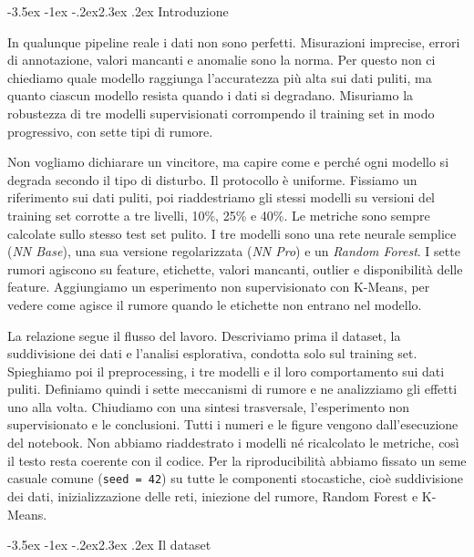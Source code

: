 \documentclass[12pt,a4paper]{article}
\makeatletter
\renewcommand\section{\@startsection{section}{1}{\z@}%
  {-3.5ex \@plus -1ex \@minus -.2ex}{2.3ex \@plus.2ex}%
  {\normalfont\Large\bfseries}}
\makeatother
\begin{document}
\section{Introduzione}\label{sec:intro}

In qualunque pipeline reale i dati non sono perfetti. Misurazioni imprecise, errori di annotazione,
valori mancanti e anomalie sono la norma. Per questo non ci chiediamo quale modello raggiunga
l'accuratezza più alta sui dati puliti, ma quanto ciascun modello resista quando i dati si degradano.
Misuriamo la robustezza di tre modelli supervisionati corrompendo il training set in modo progressivo,
con sette tipi di rumore.

Non vogliamo dichiarare un vincitore, ma capire come e perché ogni modello si degrada secondo il tipo
di disturbo. Il protocollo è uniforme. Fissiamo un riferimento sui dati puliti, poi riaddestriamo gli
stessi modelli su versioni del training set corrotte a tre livelli, 10\%, 25\% e 40\%. Le metriche
sono sempre calcolate sullo stesso test set pulito. I tre modelli sono una rete neurale semplice
(\textit{NN Base}), una sua versione regolarizzata (\textit{NN Pro}) e un \textit{Random Forest}. I sette
rumori agiscono su feature, etichette, valori mancanti, outlier e disponibilità delle feature.
Aggiungiamo un esperimento non supervisionato con K-Means, per vedere come agisce il rumore quando le
etichette non entrano nel modello.

La relazione segue il flusso del lavoro. Descriviamo prima il dataset, la suddivisione dei dati e
l'analisi esplorativa, condotta solo sul training set. Spieghiamo poi il preprocessing, i tre modelli
e il loro comportamento sui dati puliti. Definiamo quindi i sette meccanismi di rumore e ne analizziamo
gli effetti uno alla volta. Chiudiamo con una sintesi trasversale, l'esperimento non supervisionato e
le conclusioni. Tutti i numeri e le figure vengono dall'esecuzione del notebook. Non abbiamo
riaddestrato i modelli né ricalcolato le metriche, così il testo resta coerente con il codice. Per la
riproducibilità abbiamo fissato un seme casuale comune (\texttt{seed = 42}) su tutte le componenti
stocastiche, cioè suddivisione dei dati, inizializzazione delle reti, iniezione del rumore, Random
Forest e K-Means.

\section{Il dataset}\label{sec:dataset}
\end{document}
